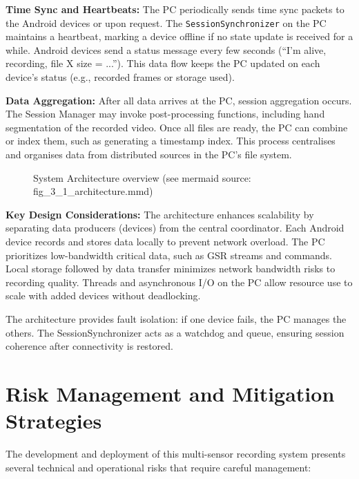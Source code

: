 \textbf{Time Sync and Heartbeats:} The PC periodically sends time sync packets to the Android devices or upon request. The \texttt{SessionSynchronizer} on the PC maintains a heartbeat, marking a device offline if no state update is received for a while. Android devices send a status message every few seconds (``I'm alive, recording, file X size = ...''). This data flow keeps the PC updated on each device's status (e.g., recorded frames or storage used).

\textbf{Data Aggregation:} After all data arrives at the PC, session aggregation occurs. The Session Manager may invoke post-processing functions, including hand segmentation of the recorded video. Once all files are ready, the PC can combine or index them, such as generating a timestamp index. This process centralises and organises data from distributed sources in the PC's file system.

\begin{figure}[ht]
    \centering
    \caption{System Architecture overview (see mermaid source: fig\_3\_1\_architecture.mmd)}
    \label{fig:figure_3_1_architecture}
\end{figure}

\textbf{Key Design Considerations:} The architecture enhances scalability by separating data producers (devices) from the central coordinator. Each Android device records and stores data locally to prevent network overload. The PC prioritizes low-bandwidth critical data, such as GSR streams and commands. Local storage followed by data transfer minimizes network bandwidth risks to recording quality. Threads and asynchronous I/O on the PC allow resource use to scale with added devices without deadlocking.

The architecture provides fault isolation: if one device fails, the PC manages the others. The SessionSynchronizer acts as a watchdog and queue, ensuring session coherence after connectivity is restored.


\section{Risk Management and Mitigation Strategies}
The development and deployment of this multi-sensor recording system presents several technical and operational risks that require careful management:

